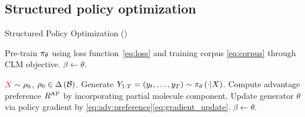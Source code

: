 \subsection{Structured policy {optimization}\label{sec:4.2}
}
\begin{algorithm}[t]
    \caption{Structured Policy Optimization (\algname)
    }\label{alg:lops}
    \begin{algorithmic}[1] 
    \State Pre-train $\pi_{{\theta}}$ using loss function~\eqref{eq:loss} and training corpus  \eqref{eq:corpus} through CLM objective.
    \State $\beta\leftarrow\theta$.

            \State ${\color{red} X} \sim \rho_0$, { $\rho_0\in \Delta \left( {\mathcal{B}} \right) $}.
            \State Generate $Y_{1:T}= \left( {y_t,\ldots,y_{T}} \right) \sim \pi_{{\theta}} \left( {\cdot|X} \right) $.
            \State Compute advantage preference
            {$R^\text{AP}$}
            by incorporating partial molecule component. %
            \State Update generator $\theta$
            via policy gradient by \eqref{eq:adv:preference}\eqref{eq:gradient_update}.
        \State $\beta\leftarrow\theta$.
    \EndFor
    \end{algorithmic}
\end{algorithm}


